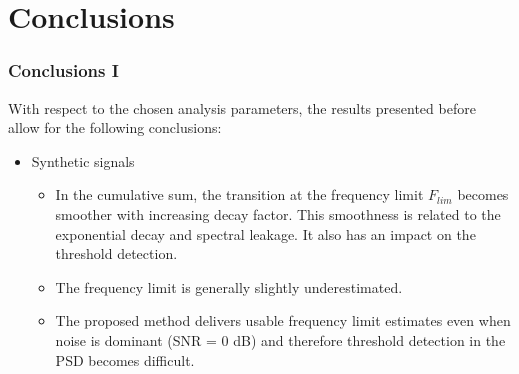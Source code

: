 \documentclass[11pt,aspectratio=169]{beamer}
\begin{document}
	\section{Conclusions}
	\begin{frame}
		\frametitle{Conclusions I}
		With respect to the chosen analysis parameters, the results presented before allow for the following conclusions:
		\begin{itemize}
			\item \parbox{50mm}{\textcolor{RIPtitlecol}{Synthetic signals}}
			\begin{itemize}
				\item In the cumulative sum, the transition at the frequency limit $F_{lim}$ becomes smoother with increasing decay factor. This smoothness is related to the exponential decay and spectral leakage. It also has an impact on the threshold detection.
				\item The frequency limit is generally slightly underestimated.
				\item The proposed method delivers usable frequency limit estimates even when noise is dominant (SNR = 0 dB) and therefore threshold detection in the PSD becomes difficult.
			\end{itemize}
		\end{itemize}
	\end{frame}
\end{document}
